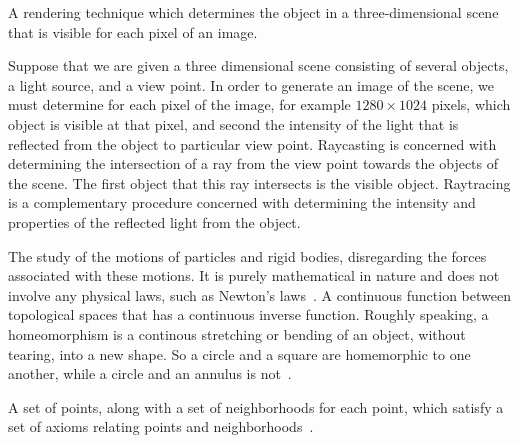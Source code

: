 

{%
    A rendering technique which determines the object in a three-dimensional scene that is visible for each pixel of an image.

    Suppose that we are given a three dimensional scene consisting of several objects, a light source, and a view point.
    In order to generate an image of the scene, we must determine for each pixel of the image, for example \( 1280 \times 1024\) pixels, which object is visible at that pixel, and second the intensity of the light that is reflected from the object to particular view point.
    Raycasting is concerned with determining the intersection of a ray from the view point towards the objects of the scene.
    The first object that this ray intersects is the visible object.
    Raytracing is a complementary procedure concerned with determining the intensity and properties of the reflected light from the object.
}


{
    The study of the motions of particles and rigid bodies, disregarding the forces associated with these motions.
    It is purely mathematical in nature and does not involve any physical laws, such as Newton's laws~\cite{greenwood1988}.
}
{
   A continuous function between topological spaces that has a continuous inverse function.
   Roughly speaking, a homeomorphism is a continous stretching or bending of an object, without tearing, into a new shape. 
   So a circle and a square are homemorphic to one another, while a circle and an annulus is not~\cite{morris1989}.
}

{
    A set of points, along with a set of neighborhoods for each point, which satisfy a set of axioms relating points and neighborhoods~\cite{morris1989}.
}
